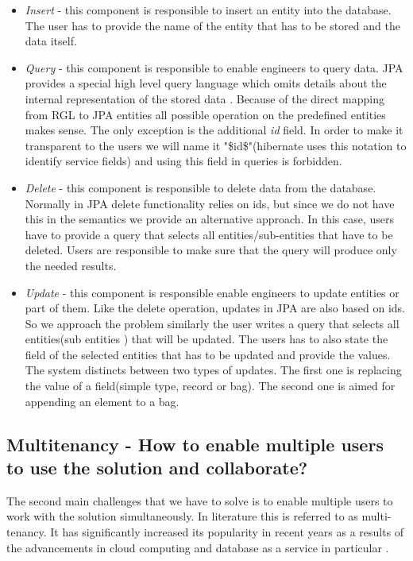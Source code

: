 \begin{itemize}
	\item \textit{Insert} - this component is responsible to insert an entity into the database. The user has to provide the name of the entity that has to be stored and the data itself.
	
	\item \textit{Query} - this component is responsible to enable engineers to query data. JPA provides a special high level query language which omits details about the internal representation of the stored data \cite{JPQL}. Because of the direct mapping from RGL to JPA entities all possible operation on the predefined entities makes sense. The only exception is the additional \textit{id} field. In order to make it transparent to the users we will name it "\$id\$"(hibernate uses this notation to identify service fields) and using this field in queries is forbidden.
	
	\item \textit{Delete} - this component is responsible to delete data from the database. Normally in JPA delete functionality relies on ids, but since we do not have this in the semantics we provide an alternative approach. In this case, users have to provide a query that selects all entities/sub-entities that have to be deleted. Users are responsible to make sure that the query will produce only the needed results.
	
	\item \textit{Update} - this component is responsible  enable engineers to update entities or part of them. Like the delete operation, updates in JPA are also based on ids. So we approach the problem similarly the user writes a query that selects all entities(sub entities ) that will be updated. The users has to also state the field of the selected entities that has to be updated and provide the values. The system distincts between two types of updates. The first one is replacing the value of a field(simple type, record or bag). The second one is aimed for appending an element to a bag.
\end{itemize}

\subsection{Multitenancy - How to enable multiple users to use the solution and collaborate?}
The second main challenges that we have to solve is to enable multiple users to work with the solution simultaneously. In literature this is referred to as multi-tenancy. It has significantly increased its popularity in recent years as a results of the advancements in cloud computing and database as a service in particular \cite{Hui}. 

